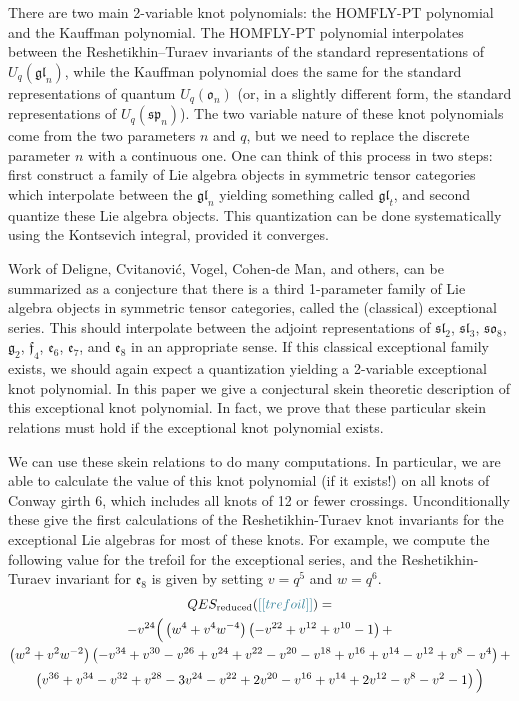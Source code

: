 \documentclass[12pt]{amsart}
\begin{document}
There are two main 2-variable knot polynomials: the HOMFLY-PT polynomial and
the Kauffman polynomial.  The HOMFLY-PT polynomial interpolates between the
Reshetikhin--Turaev invariants of the standard representations of
$U_q(\mathfrak{gl}_n)$, while the Kauffman polynomial does the same for the
standard representations of quantum $U_q(\mathfrak{o}_n)$ (or, in a slightly
different form, the standard representations of $U_q(\mathfrak{sp}_n)$).  The
two variable nature of these knot polynomials come from the two parameters $n$
and $q$, but we need to replace the discrete parameter $n$ with a continuous one.  
One can think of this process in two steps: first construct a family
of Lie algebra objects in symmetric tensor categories which interpolate
between the $\mathfrak{gl}_n$ yielding something called $\mathfrak{gl}_t$, and
second quantize these Lie algebra objects.   This quantization can be done
systematically using the Kontsevich integral, provided it converges.

Work of Deligne, Cvitanović, Vogel, Cohen-de Man, and others, can be summarized as a
conjecture that there is a third 1-parameter family of Lie algebra objects in
symmetric tensor categories, called the (classical) exceptional series.
This should interpolate between the
adjoint representations of $\mathfrak{sl}_2$, $\mathfrak{sl}_3$,
$\mathfrak{so}_8$, $\mathfrak{g}_2$, $\mathfrak{f}_4$, $\mathfrak{e}_6$,
$\mathfrak{e}_7$, and $\mathfrak{e}_8$ in an appropriate sense.  If this classical exceptional family
exists, we should again expect a quantization yielding a 2-variable
exceptional knot polynomial.  In this paper we give a conjectural skein
theoretic description of this exceptional knot polynomial. In fact, we
prove that these particular skein relations must hold if the exceptional knot polynomial
exists.

We can use these skein relations to do many computations.  In
particular, we are able to calculate the value of this knot polynomial (if it
exists!) on all knots of Conway girth 6, which includes all knots of 12 or
fewer crossings.  Unconditionally these give the first calculations of the Reshetikhin-Turaev knot invariants for the exceptional Lie algebras for most of these knots.  For example, we compute the following value for the trefoil for the exceptional series, and the Reshetikhin-Turaev invariant for $\mathfrak{e}_8$ is given by setting $v=q^5$ and $w=q^6$.
\begin{multline*}
QES_{\text{reduced}}(\nn{trefoil}) = \\
-v^{24}
\Big(
    \left(w^4 + v^4 w^{-4}\right)\left(-v^{22}+v^{12}+v^{10}-1\right)+\\
    \left(w^2 + v^2 w^{-2}\right)\left(-v^{34}+v^{30}-v^{26}+v^{24}+v^{22}-v^{20}-v^{18}+v^{16}+v^{14}-v^{12}+v^8-v^4\right)+\\
    \left(v^{36}+v^{34}-v^{32}+v^{28}-3 v^{24}-v^{22}+2 v^{20}-v^{16}+v^{14}+2 v^{12}-v^8-v^2-1\right)
    \Big)
\end{multline*}
\end{document}
